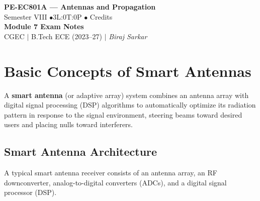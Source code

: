 \documentclass[12pt,a4paper]{article}
\begin{document}

\begin{center}
  {\LARGE\bfseries\color{myred} PE-EC801A --- Antennas and Propagation}\\[5pt]
  {\normalsize\color{mydark} Semester VIII \quad$\bullet$\quad 3L:0T:0P \quad$\bullet$ Credits}\\[3pt]
  {\normalsize\color{myteal}\textbf{Module 7 Exam Notes}}\\[3pt]
  {\small\color{mydark} CGEC \;$|$\; B.Tech ECE (2023--27) \;$|$\; \textit{Biraj Sarkar}}
\end{center}
\vspace{2pt}
\noindent{\color{myred}\rule{\linewidth}{1.5pt}}
\vspace{2pt}

\hypersetup{linkcolor=mydark}
\tableofcontents
\hypersetup{linkcolor=myteal}
\newpage

\section{Basic Concepts of Smart Antennas}

\begin{tcolorbox}[defbox, title={\textbf{Definition of Smart Antennas}}]
A \textbf{smart antenna} (or adaptive array) system combines an antenna array with digital signal processing (DSP) algorithms to automatically optimize its radiation pattern in response to the signal environment, steering beams toward desired users and placing nulls toward interferers.
\end{tcolorbox}

\subsection{Smart Antenna Architecture}
A typical smart antenna receiver consists of an antenna array, an RF downconverter, analog-to-digital converters (ADCs), and a digital signal processor (DSP).
\end{document}
